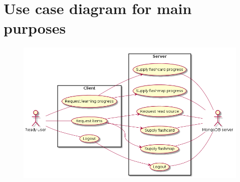 \chapter{Use case diagram for main purposes}
\label{app:mainusecase}
\begin{figure}[h!]
\centering
\includegraphics[width=\textwidth]{img/mainusecase.png}
\end{figure}
